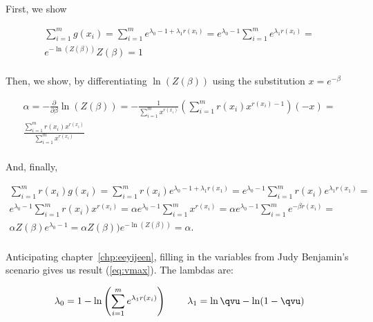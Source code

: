\documentclass[phd,12pt,oneside]{ubcthesis}
\begin{document}
First, we show

\begin{equation}
  \label{eq:unishow}
  \begin{array}{l}
\displaystyle \sum_{i=1}^{m}g(x_{i})=\sum_{i=1}^{m}e^{\lambda_{0}-1+\lambda_{1}r(x_{i})}=e^{\lambda_{0}-1}\sum_{i=1}^{m}e^{\lambda_{1}r(x_{i})}= \\
\displaystyle e^{-\ln(Z(\beta))}Z(\beta)=1 \\
  \end{array}
\end{equation}

{\noindent}Then, we show, by differentiating $\ln(Z(\beta))$ using the
substitution $x=e^{-\beta}$

\begin{equation}
  \label{eq:feicoxai}
  \begin{array}{l}
\displaystyle \alpha=-\frac{\partial}{\partial{}\beta}\ln(Z(\beta))=-\frac{1}{\sum_{i=1}^{m}x^{r(x_{i})}}\left(\sum_{i=1}^{m}r(x_{i})x^{r(x_{i})-1}\right)(-x)= \\
\displaystyle \frac{\sum_{i=1}^{m}r(x_{i})x^{r(x_{i})}}{\sum_{i=1}^{m}x^{r(x_{i})}} \\
  \end{array}
\end{equation}

{\noindent}And, finally,

\begin{equation}
  \label{eq:ayohgeix}
  \begin{array}{l}
\displaystyle \sum_{i=1}^{m}r(x_{i})g(x_{i})=\sum_{i=1}^{m}r(x_{i})e^{\lambda_{0}-1+\lambda_{1}r(x_{1})}=e^{\lambda_{0}-1}\sum_{i=1}^{m}r(x_{i})e^{\lambda_{1}r(x_{1})}= \\
\displaystyle e^{\lambda_{0}-1}\sum_{i=1}^{m}r(x_{i})x^{r(x_{i})}=\alpha{}e^{\lambda_{0}-1}\sum_{i=1}^{m}x^{r(x_{i})}=\alpha{}e^{\lambda_{0}-1}\sum_{i=1}^{m}e^{-\beta{}r(x_{i})}= \\
\displaystyle \alpha{}Z(\beta)e^{\lambda_{0}-1}=\alpha{}Z(\beta))e^{-\ln(Z(\beta))}=\alpha. \\
  \end{array}
\end{equation}

{\noindent}Anticipating chapter~\ref{chp:eeyijeen}, filling in the
variables from Judy Benjamin's scenario gives us result
({\ref{eq:vmax}}). The lambdas are:

\begin{equation}
  \label{eq:diquefuc}
\lambda_{0}=1-\ln\left(\sum_{i=1}^{m}e^{\lambda_{1}r(x_{i})}\right)\hspace{.3in}
\lambda_{1}=\ln{}{\qvu}-\ln(1-{\qvu})\notag
\end{equation}
\end{document}
